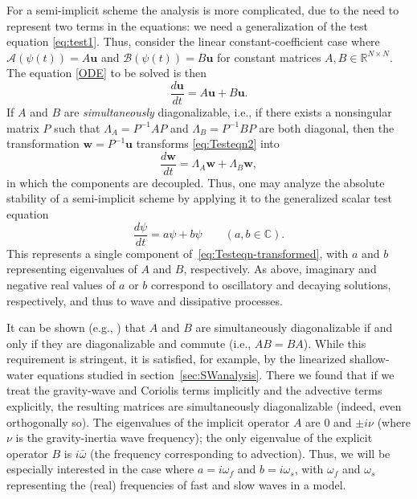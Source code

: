 \documentclass[12pt]{article}
\newcommand{\R}{\mathbb{R}}
\newcommand{\C}{\mathbb{C}}
\newcommand{\omegabar}{\bar{\omega}}
\renewcommand{\u}{\mathbf{u}}
\newcommand{\w}{\mathbf{w}}
\newcommand{\opA}{\mathcal{A}}
\newcommand{\opB}{\mathcal{B}}
\begin{document}
For a semi-implicit scheme the analysis is more complicated, due to the need
to represent two terms in the equations:  we need a generalization of the test
equation \eqref{eq:test1}.  Thus, consider the linear
constant-coefficient case where $\opA(\psi(t))=A\u$ and $\opB(\psi(t))=B\u$
for constant matrices $A,B\in\R^{N\times N}$.  The equation \eqref{ODE} to be
solved is then
\begin{equation}
  \frac{d\u}{dt} =  A\u + B\u.
\label{eq:Testeqn2}
\end{equation}
If $A$ and $B$ are \emph{simultaneously} diagonalizable, i.e., if there 
exists a nonsingular matrix $P$ such
that $\Lambda_A = P^{-1}AP$ and $\Lambda_B = P^{-1}BP$ are both diagonal, 
then the transformation $\w=P^{-1}\u$
transforms \eqref{eq:Testeqn2} into
\begin{equation}
  \frac{d\w}{dt} =  \Lambda_A\w + \Lambda_B\w,
\label{eq:Testeqn2-transformed}
\end{equation}
in which the components are decoupled.  
Thus, one may analyze the absolute stability of a semi-implicit scheme by
applying it to the generalized scalar test equation
\begin{equation}
  \frac{d\psi}{dt} = a\psi + b\psi  \qquad (a,b\in\C).
\label{eq:test2}
\end{equation}
This represents a single component of~\eqref{eq:Testeqn-transformed}, with $a$
and $b$ representing eigenvalues of $A$ and $B$, respectively.  As above,
imaginary and negative real values of $a$ or $b$ correspond to oscillatory and
decaying solutions, respectively, and thus to wave and dissipative processes.

It can be shown (e.g., \cite{Sadun01}) that $A$ and $B$ are simultaneously
diagonalizable if and only if they are diagonalizable and commute (i.e.,
$AB=BA$).  While this requirement is stringent, it is satisfied, for example,
by the linearized shallow-water equations studied in
section~\ref{sec:SWanalysis}.  There we found that if we treat the
gravity-wave and Coriolis terms implicitly and the advective terms explicitly,
the resulting matrices are simultaneously diagonalizable (indeed, even
orthogonally so).  The eigenvalues of the implicit operator $A$ are $0$ and
$\pm i\nu$ (where $\nu$ is the gravity-inertia wave frequency); the only
eigenvalue of the explicit operator $B$ is $i\omegabar$ (the frequency
corresponding to advection).  Thus, we will be especially interested in the
case where $a=i\omega_f$ and $b=i\omega_s$, with $\omega_f$ and $\omega_s$
representing the (real) frequencies of fast and slow waves in a model.
\end{document}
